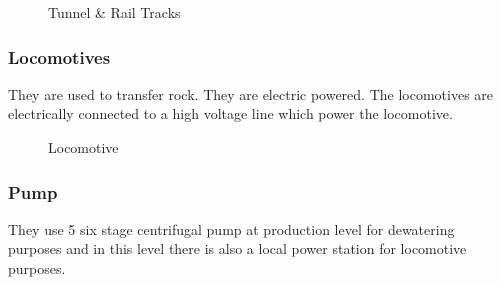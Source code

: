 \documentclass[12pt,a4paper]{article}
\begin{document}
\begin{figure}[ht]
\centering
{}
\caption{Tunnel \& Rail Tracks}
\label{tunnel}
\end{figure}

\subsubsection{Locomotives}
They are used to transfer rock. They are electric powered. The locomotives are electrically connected to a high voltage line which power the locomotive.
\begin{figure}[ht]
\centering
{}
\caption{Locomotive}
\label{locomotive}
\end{figure}

\subsubsection{Pump}
They use 5 six stage centrifugal pump at production level for dewatering purposes and in this level there is also a local power station for locomotive purposes.
\end{document}

